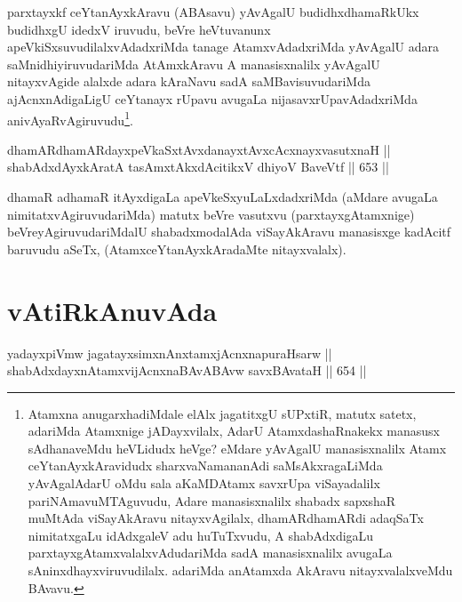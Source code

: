 \begin{artha}
parxtayxkf ceYtanAyxkAravu (ABAsavu) yAvAgalU budidhxdhamaRkUkx budidhxgU idedxV iruvudu, beVre heVtuvanunx
apeVkiSxsuvudilalxvAdadxriMda  tanage AtamxvAdadxriMda yAvAgalU adara
saMnidhiyiruvudariMda AtAmxkAravu A manasisxnalilx yAvAgalU
nitayxvAgide alalxde adara kAraNavu sadA saMBavisuvudariMda
ajAcnxnAdigaLigU ceYtanayx rUpavu avugaLa nijasavxrUpavAdadxriMda
anivAyaRvAgiruvudu\footnote{Atamxna anugarxhadiMdale elAlx jagatitxgU
sUPxtiR, matutx satetx, adariMda Atamxnige jADayxvilalx, AdarU
AtamxdashaRnakekx manasusx sAdhanaveMdu heVLidudx heVge? eMdare
yAvAgalU manasisxnalilx Atamx ceYtanAyxkAravidudx sharxvaNamananAdi
saMsAkxragaLiMda yAvAgalAdarU oMdu sala aKaMDAtamx savxrUpa
viSayadalilx pariNAmavuMTAguvudu, Adare manasisxnalilx shabadx
sapxshaR muMtAda viSayAkAravu nitayxvAgilalx, dhamARdhamARdi
adaqSaTx nimitatxgaLu idAdxgaleV adu huTuTxvudu, A shabAdxdigaLu
parxtayxgAtamxvalalxvAdudariMda sadA manasisxnalilx avugaLa
sAninxdhayxviruvudilalx. adariMda anAtamxda AkAravu nitayxvalalxveMdu
BAvavu.}.
\end{artha}


\begin{shl}
dhamARdhamARdayxpeVkaSxtAvxdanayxtAvxcAcxnayxvasutxnaH || \\
shabAdxdAyxkAratA tasAmxtAkxdAcitikxV dhiyoV BaveVtf \hfill || 653 ||  
\end{shl}

\begin{artha}
dhamaR adhamaR itAyxdigaLa apeVkeSxyuLaLxdadxriMda (aMdare avugaLa
nimitatxvAgiruvudariMda) matutx beVre vasutxvu (parxtayxgAtamxnige)
beVreyAgiruvudariMdalU shabadxmodalAda viSayAkAravu manasisxge
kadAcitf baruvudu aSeTx, (AtamxceYtanAyxkAradaMte nitayxvalalx).
\end{artha}

\section*{vAtiRkAnuvAda}

\begin{shl}
yadayxpiVmw jagatayxsimxnAnxtamxjAcnxnapuraHsarw || \\
shabAdxdayxnAtamxvijAcnxnaBAvABAvw savxBAvataH \hfill || 654 ||  
\end{shl}

